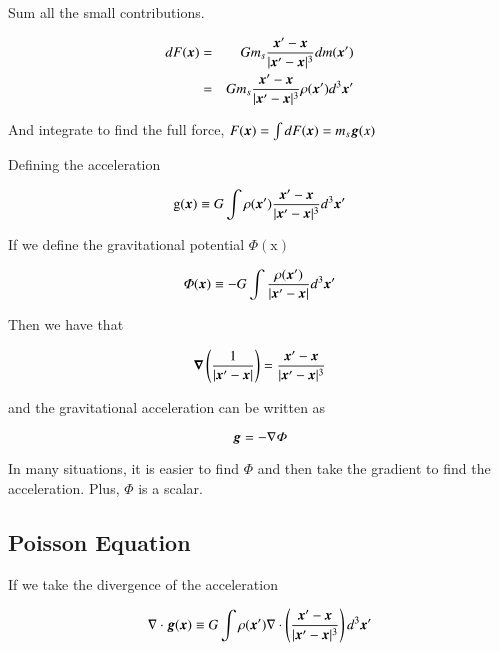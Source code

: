 Sum all the small contributions.

\begin{eqnarray}
d F({\boldsymbol{x}}) &=& G m_s \frac{{\boldsymbol{x}}^\prime - {\boldsymbol{x}}}{|{\boldsymbol{x}}^\prime-{\boldsymbol{x}}|^3} d m({\boldsymbol{x}}^\prime)\\
&=& G m_s \frac{{\boldsymbol{x}}^\prime - {\boldsymbol{x}}}{|{\boldsymbol{x}}^\prime-{\boldsymbol{x}}|^3} \rho({\boldsymbol{x}}^\prime) d^3{\boldsymbol{x}}^\prime
\end{eqnarray}

And integrate to find the full force, $F ({\boldsymbol{x}})= \int dF({\boldsymbol{x}}) = m_s {\boldsymbol{g}}(x) $

Defining the acceleration

\begin{equation}
\mathrm{g}({\boldsymbol{x}}) \equiv  G \int \rho({\boldsymbol{x}}^\prime) \frac{{\boldsymbol{x}}^\prime - {\boldsymbol{x}}}{|{\boldsymbol{x}}^\prime-{\boldsymbol{x}}|^3}  d^3{\boldsymbol{x}}^\prime
\end{equation}

If we define the gravitational potential $\varPhi(\mathrm{x})$

\begin{equation}
\varPhi({\boldsymbol{x}}) \equiv - G \int \frac{\rho({\boldsymbol{x}}^\prime)}{|{\boldsymbol{x}}^\prime-{\boldsymbol{x}}|}  d^3{\boldsymbol{x}}^\prime
\end{equation}

Then we have that

\begin{equation}
{\boldsymbol{\nabla}} \left( \frac{1}{|{\boldsymbol{x}}^\prime-{\boldsymbol{x}}|} \right) = \frac{{\boldsymbol{x}}^\prime - {\boldsymbol{x}}}{|{\boldsymbol{x}}^\prime-{\boldsymbol{x}}|^3} 
\end{equation}

and the gravitational acceleration can be written as 

\begin{equation}
{\boldsymbol{g}} = -\nabla \varPhi
\end{equation}

In many situations, it is easier to find $\varPhi$ and then take the gradient to find the acceleration. Plus, $\varPhi$ is a scalar.


\subsection{Poisson Equation}

If we take the divergence of the acceleration

\begin{equation}
\nabla \cdot {\boldsymbol{g}}({\boldsymbol{x}}) \equiv  G \int \rho({\boldsymbol{x}}^\prime)  \nabla \cdot \left( \frac{{\boldsymbol{x}}^\prime - {\boldsymbol{x}}}{|{\boldsymbol{x}}^\prime-{\boldsymbol{x}}|^3} \right) d^3{\boldsymbol{x}}^\prime
\end{equation}

